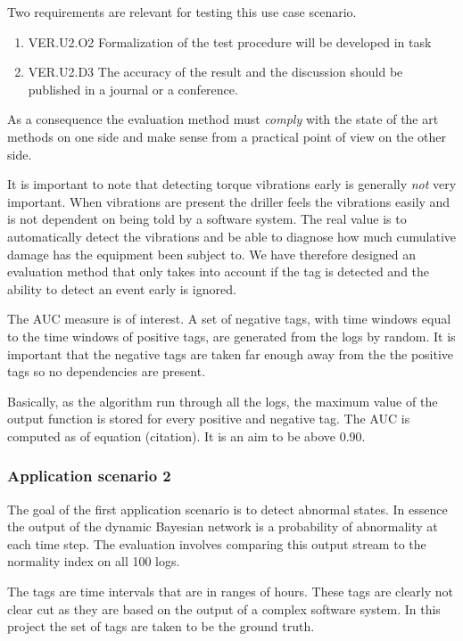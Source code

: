 \documentclass{article}
\theoremstyle{theorem}
\theoremstyle{definition}
\begin{document}
Two requirements are relevant for testing this use case scenario.  
\begin{enumerate}
\item VER.U2.O2 Formalization of the test procedure will be developed in task 
\item VER.U2.D3 The accuracy of the result and the discussion should be published in a journal or a conference. 
\end{enumerate}

As a consequence the evaluation method must \emph{comply} with the state of the art methods on one side and make sense from a practical point of view on the other side.

It is important to note that detecting torque vibrations early is generally \emph{not} very important.  When vibrations are present the driller feels the vibrations easily and is not dependent on being told by a software system. The real value is to automatically detect the vibrations and be able to diagnose how much cumulative damage has the equipment been subject to.  We have therefore designed an evaluation method that only takes into account if the tag is detected and the ability to detect an event early is ignored.

The AUC measure is of interest.  A set of negative tags, with time windows equal to the time windows of positive tags, are generated from the logs by random.  It is important that the negative tags are taken far enough away from the the positive tags so no dependencies are present.  

Basically, as the algorithm run through all the logs, the maximum value of the output function is stored for every positive and negative tag.  The AUC is computed as of equation (citation).  It is an aim to be above 0.90. 

\subsubsection{Application scenario 2}

The goal of the first application scenario is to detect abnormal states.  In essence the output of the dynamic Bayesian network is a probability of abnormality at each time step. The evaluation involves comparing this output stream to the normality index on all 100 logs.  

The tags are time intervals that are in ranges of hours. These tags are clearly not clear cut as they are based on the output of a complex software system.  In this project the set of tags are taken to be the ground truth.  
\end{document}
